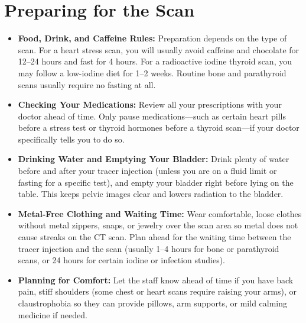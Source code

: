 \section{Preparing for the Scan}
\begin{itemize}
    \item \textbf{Food, Drink, and Caffeine Rules:} Preparation depends on the type of scan. For a heart stress scan, you will usually avoid caffeine and chocolate for 12--24 hours and fast for 4 hours. For a radioactive iodine thyroid scan, you may follow a low-iodine diet for 1--2 weeks. Routine bone and parathyroid scans usually require no fasting at all.
    \item \textbf{Checking Your Medications:} Review all your prescriptions with your doctor ahead of time. Only pause medications---such as certain heart pills before a stress test or thyroid hormones before a thyroid scan---if your doctor specifically tells you to do so.
    \item \textbf{Drinking Water and Emptying Your Bladder:} Drink plenty of water before and after your tracer injection (unless you are on a fluid limit or fasting for a specific test), and empty your bladder right before lying on the table. This keeps pelvic images clear and lowers radiation to the bladder.
    \item \textbf{Metal-Free Clothing and Waiting Time:} Wear comfortable, loose clothes without metal zippers, snaps, or jewelry over the scan area so metal does not cause streaks on the CT scan. Plan ahead for the waiting time between the tracer injection and the scan (usually 1--4 hours for bone or parathyroid scans, or 24 hours for certain iodine or infection studies).
    \item \textbf{Planning for Comfort:} Let the staff know ahead of time if you have back pain, stiff shoulders (some chest or heart scans require raising your arms), or claustrophobia so they can provide pillows, arm supports, or mild calming medicine if needed.
\end{itemize}

